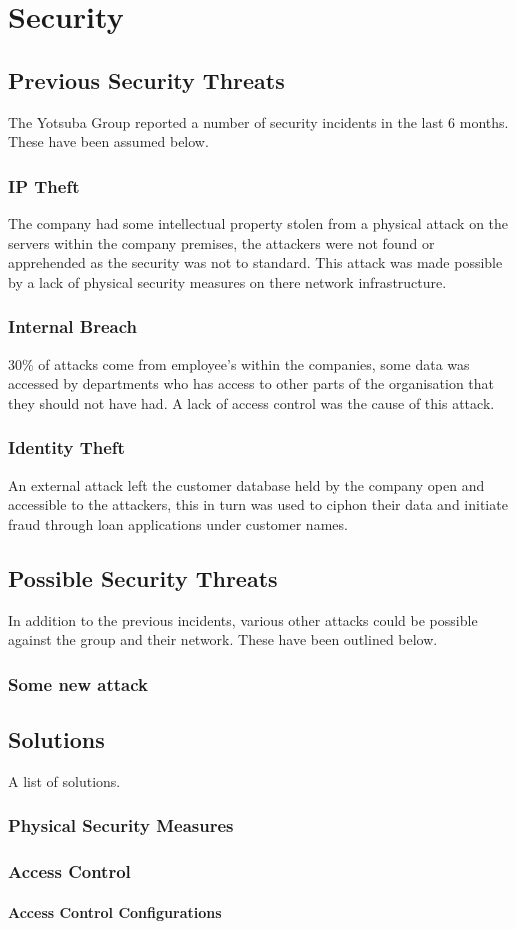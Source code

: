 \chapter{Security}

\section{Previous Security Threats}
The Yotsuba Group reported a number of security incidents in the last 6 months. These have been assumed below.
\subsection{IP Theft}
The company had some intellectual property stolen from a physical attack on the servers within the company premises, the attackers were not found or apprehended as the security was not to standard. This attack was made possible by a lack of physical security measures on there network infrastructure.
\subsection{Internal Breach}
30\% of attacks come from employee’s within the companies, some data was accessed by departments who has access to other parts of the organisation that they should not have had. A lack of access control was the cause of this attack.
\subsection{Identity Theft}
An external attack left the customer database held by the company open and accessible to the attackers, this in turn was used to ciphon their data and initiate fraud through loan applications under customer names.
\section{Possible Security Threats}
In addition to the previous incidents, various other attacks could be possible against the group and their network. These have been outlined below.
\subsection{Some new attack}
\section{Solutions}
A list of solutions.
\subsection{Physical Security Measures}
\subsection{Access Control}
\subsubsection{Access Control Configurations}